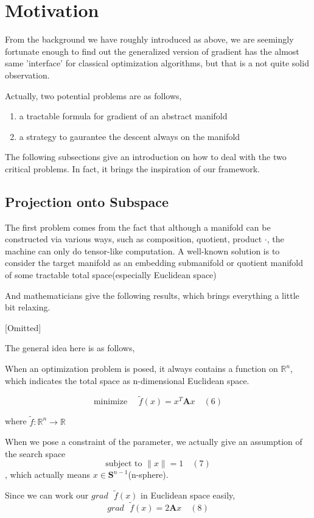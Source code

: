 \documentclass[letterpaper]{article}
\begin{document}
\section{Motivation}
From the background we have roughly introduced as above, we are seemingly fortunate enough to find out the generalized version of gradient has the almost same 'interface' for classical optimization algorithms, but
that is a not quite solid observation.

Actually, two potential problems are as follows,
\begin{enumerate}
  \item a tractable formula for gradient of an abstract manifold
  \item a strategy to gaurantee the descent always on the manifold
\end{enumerate}

The following subsections give an introduction on how to deal with the two critical problems. In fact, it brings the inspiration of our framework.

\subsection{Projection onto Subspace}
The first problem comes from the fact that although a manifold can be constructed via various ways, such as composition, quotient, product $\cdot$, the machine can only
do tensor-like computation. A well-known solution is to consider the target manifold as an embedding submanifold or quotient manifold of some tractable total space(especially Euclidean space)

And mathematicians give the following results, which brings everything a little bit relaxing.

[Omitted]

The general idea here is as follows,

When an optimization problem is posed, it always contains a function on $\mathbb{R}^n$, which indicates the total space as n-dimensional Euclidean space.

$$
   \text{minimize } \quad \tilde{f}(x)=x^{T}\mathbf{A}x \quad (6)
$$

where $\tilde{f}:\mathbb{R}^n\to\mathbb{R}$

When we pose a constraint of the parameter, we actually give an assumption of the search space
$$
  \text{subject to } \|x\|=1 \quad (7)
$$
, which actually means $x\in\mathbf{S}^{n-1}$(n-sphere).

Since we can work our $grad\text{ }\tilde{f}(x)$ in Euclidean space easily,
$$
  grad\text{ }\tilde{f}(x)=2\mathbf{A}x \quad (8)
$$
\end{document}
